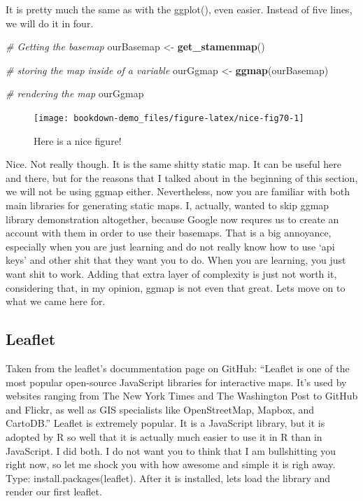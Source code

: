 \documentclass[]{book}
\newenvironment{Shaded}{\begin{snugshade}}{\end{snugshade}}
\newcommand{\CommentTok}[1]{\textcolor[rgb]{0.56,0.35,0.01}{\textit{#1}}}
\newcommand{\KeywordTok}[1]{\textcolor[rgb]{0.13,0.29,0.53}{\textbf{#1}}}
\newcommand{\NormalTok}[1]{#1}
\newcommand{\StringTok}[1]{\textcolor[rgb]{0.31,0.60,0.02}{#1}}
\begin{document}
It is pretty much the same as with the ggplot(), even easier. Instead of five lines, we will do it in four.

\begin{Shaded}
\begin{Highlighting}[]
\CommentTok{# Getting the basemap}
\NormalTok{ourBasemap <-}\StringTok{ }\KeywordTok{get_stamenmap}\NormalTok{() }

\CommentTok{# storing the map inside of a variable}
\NormalTok{ourGgmap <-}\StringTok{ }\KeywordTok{ggmap}\NormalTok{(ourBasemap) }

\CommentTok{# rendering the map}
\NormalTok{ourGgmap}
\end{Highlighting}
\end{Shaded}

\begin{figure}

{\centering \texttt{[image: bookdown-demo\_files/figure-latex/nice-fig70-1]} 

}

\caption{Here is a nice figure!}\label{fig:nice-fig70}
\end{figure}

Nice. Not really though. It is the same shitty static map. It can be useful here and there, but for the reasons that I talked about in the beginning of this section, we will not be using ggmap either. Nevertheless, now you are familiar with both main libraries for generating static maps. I, actually, wanted to skip ggmap library demonstration altogether, because Google now requres us to create an account with them in order to use their basemaps. That is a big annoyance, especially when you are just learning and do not really know how to use `api keys' and other shit that they want you to do. When you are learning, you just want shit to work. Adding that extra layer of complexity is just not worth it, considering that, in my opinion, ggmap is not even that great. Lets move on to what we came here for.

\hypertarget{leaflet}{%
\subsection{Leaflet}\label{leaflet}}

Taken from the leaflet's docummentation page on GitHub: ``Leaflet is one of the most popular open-source JavaScript libraries for interactive maps. It's used by websites ranging from The New York Times and The Washington Post to GitHub and Flickr, as well as GIS specialists like OpenStreetMap, Mapbox, and CartoDB.'' Leaflet is extremely popular. It is a JavaScript library, but it is adopted by R so well that it is actually much easier to use it in R than in JavaScript. I did both. I do not want you to think that I am bullshitting you right now, so let me shock you with how awesome and simple it is righ away. Type: install.packages(leaflet). After it is installed, lets load the library and render our first leaflet.
\end{document}
